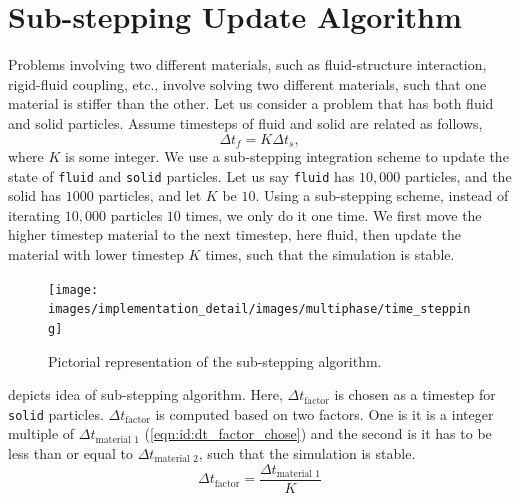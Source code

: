 \section{Sub-stepping Update Algorithm}
\label{sec:substepping-algorithm}
Problems involving two different materials, such as fluid-structure interaction,
rigid-fluid coupling, etc., involve solving two different materials, such that
one material is stiffer than the other. Let us consider a problem that has both
fluid and solid particles. Assume timesteps of fluid and solid are related as
follows,
\begin{equation}
\Delta t_f = K \Delta t_s,
\end{equation}
where $K$ is some integer. We use a sub-stepping integration scheme to update
the state of \texttt{fluid} and \texttt{solid} particles. Let us say
\texttt{fluid} has $10,000$ particles, and the solid has $1000$ particles, and
let $K$ be $10$. Using a sub-stepping scheme, instead of iterating $10,000$
particles $10$ times, we only do it one time. We first move the higher timestep
material to the next timestep, here fluid, then update the material with lower
timestep $K$ times, such that the simulation is stable.
\begin{figure}[!htpb]
  \centering
  \texttt{[image: images/implementation\_detail/images/multiphase/time\_stepping]}
  \caption{Pictorial representation of the sub-stepping algorithm.}
\label{fig:id:multiphase}
\end{figure}
 depicts idea of sub-stepping algorithm. Here,
$\Delta t_{\text{factor}}$ is chosen as a timestep for \texttt{solid} particles.
$\Delta t_{\text{factor}}$ is computed based on two factors. One is it is a
integer multiple of $\Delta t_{\text{material 1}}$
(\cref{eqn:id:dt_factor_chose}) and the second is it has to be less than or
equal to $\Delta t_{\text{material 2}}$, such that the simulation is stable.
\begin{equation}
\label{eqn:id:dt_factor_chose}
\Delta t_{\text{factor}} = \frac{\Delta t_{\text{material 1}}}{K}
\end{equation}


\FloatBarrier%
